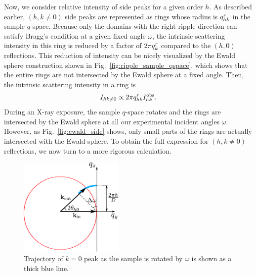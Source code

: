 Now, we consider relative intensity of side peaks for a given order $h$.
As described earlier, $(h, k\neq 0)$ side peaks are represented as
rings whose radius is $q_{hk}^r$ in the sample $q$-space. 
Because only the domains with the right ripple direction can satisfy Bragg's condition at a given fixed
angle $\omega$, the intrinsic scattering intensity in this ring is reduced by 
a factor of $2\pi q_{k}^r$ compared to the $(h, 0)$ reflections.
This reduction of intensity can be nicely visualized by the Ewald sphere construction
shown in Fig.~\ref{fig:ripple_sample_qspace},
which shows that the entire rings are not intersected by the Ewald sphere at 
a fixed angle. Then, the intrinsic scattering intensity in a ring is
\begin{equation}
  I_{hk\neq 0} \propto 2\pi q_{hk}^r I_{hk}^\textrm{obs}. \label{eq:side_ewald}
\end{equation}
During an X-ray exposure, the sample $q$-space rotates and 
the rings are intersected by the Ewald sphere at all our experimental incident angles $\omega$.
However, as Fig.~\ref{fig:ewald_side} shows, only small parts of the rings
are actually intersected with the Ewald sphere.  
To obtain the full expression for $(h,k\neq 0)$ reflections, we now turn
to a more rigorous calculation.

\begin{figure}[htbp]
  \centering
  \includegraphics[width=0.45\textwidth]{figures/ripple/analysis/ewald_main}
  \caption{Trajectory of $k=0$ peak as the sample is rotated by $\omega$ is 
  shown as a thick blue line.}
  \label{fig:ewald_main}
\end{figure}

